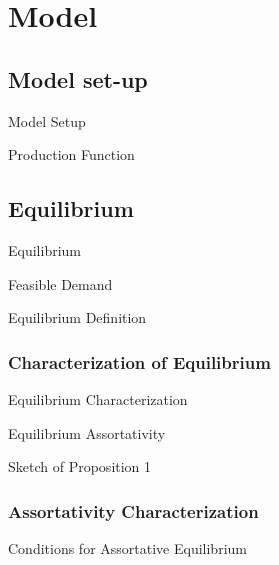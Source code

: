 \documentclass[notes,11pt, aspectratio=169]{beamer}
\begin{document}
\section{Model}

\subsection{Model set-up}
\begin{frame}{Model Setup}
\end{frame}
\begin{frame}{Production Function}
\end{frame}


\subsection{Equilibrium}
\begin{frame}{Equilibrium}
\end{frame}

\begin{frame}{Feasible Demand}
\end{frame}

\begin{frame}{Equilibrium Definition}
\end{frame}

\subsubsection{Characterization of Equilibrium}
\begin{frame}{Equilibrium Characterization}
\end{frame}

\begin{frame}{Equilibrium Assortativity}
\end{frame}

\begin{frame}{Sketch of Proposition 1}
\end{frame}


\subsubsection{Assortativity Characterization}
\begin{frame}{Conditions for Assortative Equilibrium}
\end{frame}
\end{document}
